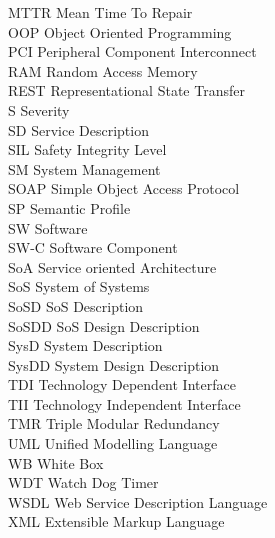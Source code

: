 MTTR \tocdotfill Mean Time To Repair\\
OOP \tocdotfill Object Oriented Programming\\
PCI \tocdotfill Peripheral Component Interconnect\\
RAM \tocdotfill Random Access Memory\\
REST \tocdotfill Representational State Transfer\\
S \tocdotfill Severity\\
SD \tocdotfill Service Description\\
SIL \tocdotfill Safety Integrity Level\\
SM \tocdotfill System Management\\
SOAP \tocdotfill Simple Object Access Protocol\\
SP \tocdotfill Semantic Profile\\
SW \tocdotfill Software\\
SW-C \tocdotfill Software Component\\
SoA \tocdotfill Service oriented Architecture\\
SoS \tocdotfill System of Systems\\
SoSD \tocdotfill SoS Description\\
SoSDD \tocdotfill SoS Design Description\\
SysD \tocdotfill System Description\\
SysDD \tocdotfill System Design Description\\
TDI \tocdotfill Technology Dependent Interface\\
TII \tocdotfill Technology Independent Interface\\
TMR \tocdotfill Triple Modular Redundancy\\
UML \tocdotfill Unified Modelling Language\\
WB \tocdotfill White Box\\
WDT \tocdotfill Watch Dog Timer\\
WSDL \tocdotfill Web Service Description Language\\
XML \tocdotfill Extensible Markup Language\\